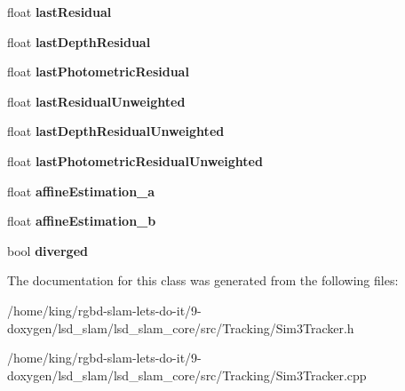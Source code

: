 \begin{DoxyCompactItemize}
\item 
\hypertarget{classlsd__slam_1_1_sim3_tracker_a333c6854e14d5af3e17566564203b098}{float {\bfseries last\-Residual}}\label{classlsd__slam_1_1_sim3_tracker_a333c6854e14d5af3e17566564203b098}

\item 
\hypertarget{classlsd__slam_1_1_sim3_tracker_ad812f12cb6077ad6457eaa142cd71e84}{float {\bfseries last\-Depth\-Residual}}\label{classlsd__slam_1_1_sim3_tracker_ad812f12cb6077ad6457eaa142cd71e84}

\item 
\hypertarget{classlsd__slam_1_1_sim3_tracker_a1a3fdb5ce907925bcc1b117047f6770b}{float {\bfseries last\-Photometric\-Residual}}\label{classlsd__slam_1_1_sim3_tracker_a1a3fdb5ce907925bcc1b117047f6770b}

\item 
\hypertarget{classlsd__slam_1_1_sim3_tracker_a06b272f273ca16e83bff25c2dea83c98}{float {\bfseries last\-Residual\-Unweighted}}\label{classlsd__slam_1_1_sim3_tracker_a06b272f273ca16e83bff25c2dea83c98}

\item 
\hypertarget{classlsd__slam_1_1_sim3_tracker_af07a6cf4dd96d2590b11a40875c0ac96}{float {\bfseries last\-Depth\-Residual\-Unweighted}}\label{classlsd__slam_1_1_sim3_tracker_af07a6cf4dd96d2590b11a40875c0ac96}

\item 
\hypertarget{classlsd__slam_1_1_sim3_tracker_af38ad7ee70f1ccc128bb1543ff81194e}{float {\bfseries last\-Photometric\-Residual\-Unweighted}}\label{classlsd__slam_1_1_sim3_tracker_af38ad7ee70f1ccc128bb1543ff81194e}

\item 
\hypertarget{classlsd__slam_1_1_sim3_tracker_abe395969034142d13a714b1d1ab2badd}{float {\bfseries affine\-Estimation\-\_\-a}}\label{classlsd__slam_1_1_sim3_tracker_abe395969034142d13a714b1d1ab2badd}

\item 
\hypertarget{classlsd__slam_1_1_sim3_tracker_a8e3bc57b65c2dd1d5616f7aacfa4e0dd}{float {\bfseries affine\-Estimation\-\_\-b}}\label{classlsd__slam_1_1_sim3_tracker_a8e3bc57b65c2dd1d5616f7aacfa4e0dd}

\item 
\hypertarget{classlsd__slam_1_1_sim3_tracker_a98f0bf162c32f20da815a75eb4cf674a}{bool {\bfseries diverged}}\label{classlsd__slam_1_1_sim3_tracker_a98f0bf162c32f20da815a75eb4cf674a}

\end{DoxyCompactItemize}


The documentation for this class was generated from the following files\-:\begin{DoxyCompactItemize}
\item 
/home/king/rgbd-\/slam-\/lets-\/do-\/it/9-\/doxygen/lsd\-\_\-slam/lsd\-\_\-slam\-\_\-core/src/\-Tracking/Sim3\-Tracker.\-h\item 
/home/king/rgbd-\/slam-\/lets-\/do-\/it/9-\/doxygen/lsd\-\_\-slam/lsd\-\_\-slam\-\_\-core/src/\-Tracking/Sim3\-Tracker.\-cpp\end{DoxyCompactItemize}
